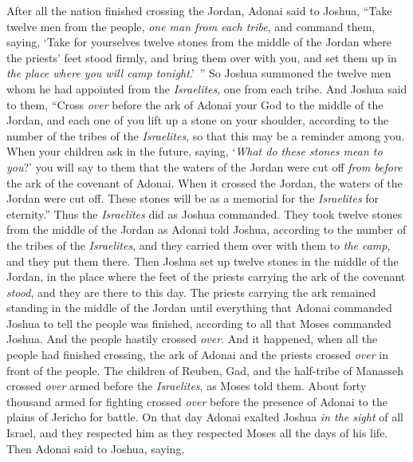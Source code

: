 \begin{biblechapter} %
 After all the nation finished crossing the Jordan, Adonai said to Joshua,
\verse “Take twelve men from the people, \textit{one man from each tribe},
\verse and command them, saying, ‘Take for yourselves twelve stones from the middle of the Jordan where the priests’ feet stood firmly, and bring them over with you, and set them up in \textit{the place where you will camp tonight}.’ ”
\verse So Joshua summoned the twelve men whom he had appointed from the \textit{Israelites}, one from each tribe.
\verse And Joshua said to them, “Cross \textit{over} before the ark of Adonai your God to the middle of the Jordan, and each one of you lift up a stone on your shoulder, according to the number of the tribes of the \textit{Israelites},
\verse so that this may be a reminder among you. When your children ask in the future, saying, ‘\textit{What do these stones mean to you}?’
\verse you will say to them that the waters of the Jordan were cut off \textit{from before} the ark of the covenant of Adonai. When it crossed the Jordan, the waters of the Jordan were cut off. These stones will be as a memorial for the \textit{Israelites} for eternity.”
\verse Thus the \textit{Israelites} did as Joshua commanded. They took twelve stones from the middle of the Jordan as Adonai told Joshua, according to the number of the tribes of the \textit{Israelites}, and they carried them over with them to \textit{the camp}, and they put them there.
\verse Then Joshua set up twelve stones in the middle of the Jordan, in the place where the feet of the priests carrying the ark of the covenant \textit{stood}, and they are there to this day.
\verse The priests carrying the ark remained standing in the middle of the Jordan until everything that Adonai commanded Joshua to tell the people was finished, according to all that Moses commanded Joshua. And the people hastily crossed \textit{over}.
\verse And it happened, when all the people had finished crossing, the ark of Adonai and the priests crossed \textit{over} in front of the people.
\verse The children of Reuben, Gad, and the half-tribe of Manasseh crossed \textit{over} armed before the \textit{Israelites}, as Moses told them.
\verse About forty thousand armed for fighting crossed \textit{over} before the presence of Adonai to the plains of Jericho for battle.
\verse On that day Adonai exalted Joshua \textit{in the sight} of all Israel, and they respected him as they respected Moses all the days of his life.
\verse Then Adonai said to Joshua, saying,

\end{biblechapter}
